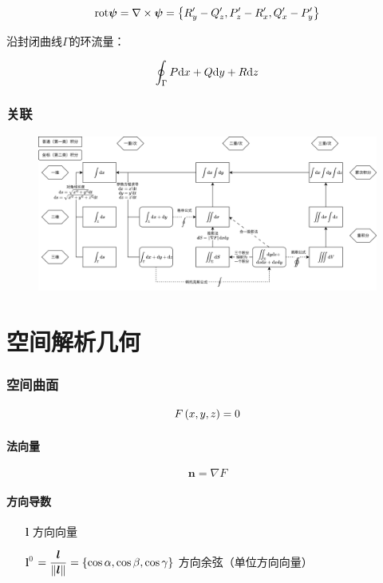 \documentclass{article}
\begin{document}
\[\mathrm{rot}\boldsymbol\psi=
    \nabla\times\boldsymbol\psi=\left\{R_y^\prime-Q_z^\prime,P_z^\prime-R_x^\prime,Q_x^\prime-P_y^\prime\right\}\]

沿封闭曲线$\Gamma$的环流量：

\[\oint_\Gamma P\mathrm d x+Q\mathrm d y+R \mathrm d z\]

\section{关联}

\begin{figure}[H]
    \centering
    \includegraphics[width=\linewidth]{RelationshipsOfMultipleIntegrals.png}
\end{figure}

\part{空间解析几何}

\section{空间曲面}

\[F\left(x,y,z\right)=0\]

\subsection{法向量}

\[\boldsymbol n=\nabla F\]

\subsection{方向导数}

\begin{enumerate}
    \item[$\boldsymbol l$] 方向向量
    \item[$\boldsymbol l^0$] $=\dfrac{\boldsymbol l}{\left\Vert\boldsymbol l\right\Vert}=\left\{\cos\alpha,\cos\beta,\cos\gamma\right\}$ 方向余弦（单位方向向量）
\end{enumerate}
\end{document}

